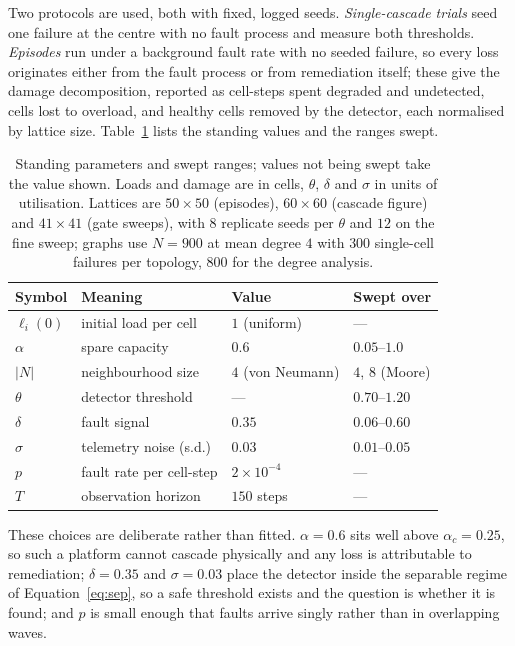 \documentclass[11pt,a4paper]{article}
\begin{document}
Two protocols are used, both with fixed, logged seeds. \emph{Single-cascade
trials} seed one failure at the centre with no fault process and measure both
thresholds. \emph{Episodes} run under a background fault rate with no seeded
failure, so every loss originates either from the fault process or from
remediation itself; these give the damage decomposition, reported as cell-steps
spent degraded and undetected, cells lost to overload, and healthy cells removed
by the detector, each normalised by lattice size. Table~\ref{tab:params} lists
the standing values and the ranges swept.

\begin{table}[t]
\centering\scriptsize
\caption{Standing parameters and swept ranges; values not being swept take the
value shown. Loads and damage are in cells, $\theta$, $\delta$ and $\sigma$ in
units of utilisation. Lattices are $50\times50$ (episodes), $60\times60$ (cascade
figure) and $41\times41$ (gate sweeps), with $8$ replicate seeds per $\theta$ and
$12$ on the fine sweep; graphs use $N = 900$ at mean degree $4$ with $300$
single-cell failures per topology, $800$ for the degree analysis.}
\label{tab:params}
\begin{tabular}{@{}llll@{}}
\toprule
\textbf{Symbol} & \textbf{Meaning} & \textbf{Value} & \textbf{Swept over} \\
\midrule
$\ell_i(0)$ & initial load per cell & $1$ (uniform) & --- \\
$\alpha$    & spare capacity        & $0.6$ & $0.05$--$1.0$ \\
$|N|$       & neighbourhood size    & $4$ (von Neumann) & $4$, $8$ (Moore) \\
$\theta$    & detector threshold    & --- & $0.70$--$1.20$ \\
$\delta$    & fault signal          & $0.35$ & $0.06$--$0.60$ \\
$\sigma$    & telemetry noise (s.d.) & $0.03$ & $0.01$--$0.05$ \\
$p$         & fault rate per cell-step & $2\times10^{-4}$ & --- \\
$T$         & observation horizon   & $150$ steps & --- \\
\bottomrule
\end{tabular}
\end{table}

These choices are deliberate rather than fitted. $\alpha = 0.6$ sits well above
$\alpha_c = 0.25$, so such a platform cannot cascade physically and any loss is
attributable to remediation; $\delta = 0.35$ and $\sigma = 0.03$ place the
detector inside the separable regime of Equation~\ref{eq:sep}, so a safe
threshold exists and the question is whether it is found; and $p$ is small
enough that faults arrive singly rather than in overlapping waves.
\end{document}
